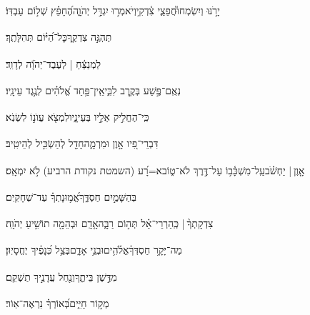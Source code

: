 \documentclass[12pt]{article}
\newcommand{\loc}[1]{\textsuperscript{\locf{#1}}}
\begin{document}
{\loc{ כז}~}‏יָרֹ֣נּוּ וְיִשְׂמְחוּ֮{\hfill}חֲפֵצֵ֢י צִ֫דְקִ֥י\newline\hspace*{.5em}וְיֹאמְר֣וּ  יִגְדַּ֣ל יְהֹוָ֑ה{\hfill}הֶ֝חָפֵ֗ץ שְׁל֣וֹם עַבְדּֽוֹ׃\par

{\loc{ כח}~}‏ תֶּהְגֶּ֣ה צִדְקֶ֑ךָ{\hfill}כׇּל־הַ֝יּ֗וֹם תְּהִלָּתֶֽךָ׃\par\pend
\ledpb
\pstart[\subsection*{\textcolor{red}{פרק לו}}]\label{פרק לו}
{\loc{ א}~}‏לַמְנַצֵּ֬חַ | לְעֶבֶד־יְהֹוָ֬ה לְדָוִֽד׃\par

{\loc{ ב}~}‏נְאֻֽם־פֶּ֣שַׁע  בְּקֶ֣רֶב לִבִּ֑י{\hfill}אֵֽין־פַּ֥חַד אֱ֝לֹהִ֗ים לְנֶ֣גֶד עֵינָֽיו׃\par

{\loc{ ג}~}‏כִּֽי־הֶחֱלִ֣יק אֵלָ֣יו בְּעֵינָ֑יו{\hfill}לִמְצֹ֖א עֲוֺנ֣וֹ לִשְׂנֹֽא׃\par

{\loc{ ד}~}‏דִּבְרֵי־פִ֭יו אָ֣וֶן וּמִרְמָ֑ה{\hfill}חָדַ֖ל לְהַשְׂכִּ֣יל לְהֵיטִֽיב׃\par

{\loc{ ה}~}‏אָ֤וֶן |  יַחְשֹׁ֗ב{\hfill}עַֽל־מִשְׁכָּ֫ב֥וֹ\newline\hspace*{.5em} עַל־דֶּ֣רֶךְ לֹא־ט֑וֹב{\hfill}א=רָ֝ע (השמטת נקודת הרביע) לֹ֣א יִמְאָֽס׃\par

{\loc{ ו}~}‏ בְּהַשָּׁמַ֣יִם חַסְדֶּ֑ךָ{\hfill}אֱ֝מ֥וּנָתְךָ֗ עַד־שְׁחָקִֽים׃\par

{\loc{ ז}~}‏צִדְקָתְךָ֨ | {\hfill}כְּֽהַרְרֵי־אֵ֗ל\newline\hspace*{.5em} תְּה֣וֹם רַבָּ֑ה{\hfill}אָ֤דָֽם וּבְהֵמָ֖ה תוֹשִׁ֣יעַ יְהֹוָֽה׃\par

{\loc{ ח}~}‏מַה־יָּקָ֥ר חַסְדְּךָ֗{\hfill}אֱלֹ֫הִ֥ים\newline\hspace*{.5em}וּבְנֵ֥י אָדָ֑ם{\hfill}בְּצֵ֥ל כְּ֝נָפֶ֗יךָ יֶחֱסָיֽוּן׃\par

{\loc{ ט}~}‏ מִדֶּ֣שֶׁן בֵּיתֶ֑ךָ{\hfill}וְנַ֖חַל עֲדָנֶ֣יךָ תַשְׁקֵֽם׃\par

{\loc{ י}~}‏ מְק֣וֹר חַיִּ֑ים{\hfill}בְּ֝אוֹרְךָ֗ נִרְאֶה־אֽוֹר׃\par
\end{document}

